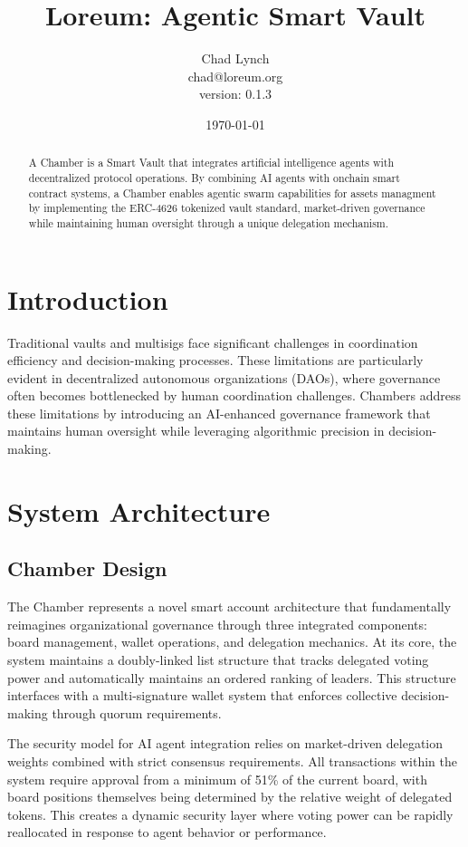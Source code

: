 \documentclass[12pt]{article}
\title{Loreum: Agentic Smart Vault}
\author{Chad Lynch \\ \small{chad@loreum.org} \\ \small{version: 0.1.3}}
\date{\today}
\begin{document}
\maketitle

\begin{abstract}
A Chamber is a Smart Vault that integrates artificial intelligence agents with decentralized protocol operations. By combining AI agents with onchain smart contract systems, a Chamber enables agentic swarm capabilities for assets managment by implementing the ERC-4626 tokenized vault standard, market-driven governance while maintaining human oversight through a unique delegation mechanism.
\end{abstract}

\section{Introduction}
Traditional vaults and multisigs face significant challenges in coordination efficiency and decision-making processes. These limitations are particularly evident in decentralized autonomous organizations (DAOs), where governance often becomes bottlenecked by human coordination challenges. Chambers address these limitations by introducing an AI-enhanced governance framework that maintains human oversight while leveraging algorithmic precision in decision-making.

\section{System Architecture}

\subsection{Chamber Design}
The Chamber represents a novel smart account architecture that fundamentally reimagines organizational governance through three integrated components: board management, wallet operations, and delegation mechanics. At its core, the system maintains a doubly-linked list structure that tracks delegated voting power and automatically maintains an ordered ranking of leaders. This structure interfaces with a multi-signature wallet system that enforces collective decision-making through quorum requirements.

The security model for AI agent integration relies on market-driven delegation weights combined with strict consensus requirements. All transactions within the system require approval from a minimum of 51\% of the current board, with board positions themselves being determined by the relative weight of delegated tokens. This creates a dynamic security layer where voting power can be rapidly reallocated in response to agent behavior or performance.
\end{document}
